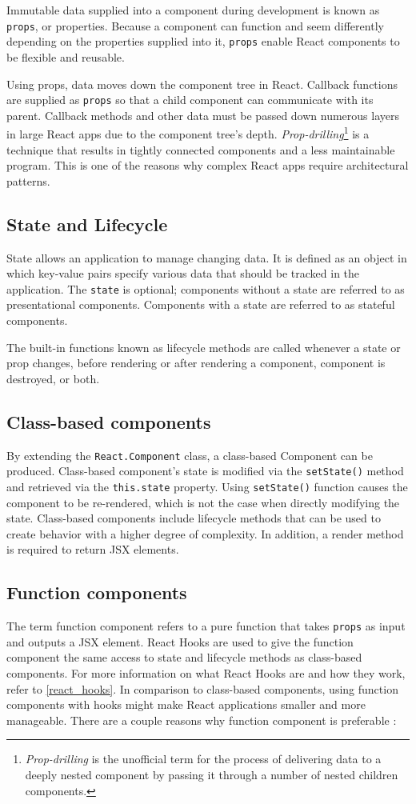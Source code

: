 Immutable data supplied into a component during development is known as \texttt{props}, or properties. Because a component can function and seem differently depending on the properties supplied into it, \texttt{props} enable React components to be flexible and reusable.

Using props, data moves down the component tree in React. Callback functions are supplied as \texttt{props} so that a child component can communicate with its parent. Callback methods and other data must be passed down numerous layers in large React apps due to the component tree's depth. \emph{Prop-drilling}\footnote{\emph{Prop-drilling} is the unofficial term for the process of delivering data to a deeply nested component by passing it through a number of nested children components.} is a technique that results in tightly connected components and a less maintainable program. This is one of the reasons why complex React apps require architectural patterns.

\subsection{State and Lifecycle}
State allows an application to manage changing data. It is defined as an object in which key-value pairs specify various data that should be tracked in the application. The \texttt{state} is optional; components without a state are referred to as presentational components. Components with a state are referred to as stateful components.

The built-in functions known as lifecycle methods are called whenever a state or prop changes, before rendering or after rendering a component, component is destroyed, or both.

\subsection{Class-based components}
By extending the \texttt{React.Component} class, a class-based Component can be produced. Class-based component's state is modified via the \texttt{setState()} method and retrieved via the \texttt{this.state} property. Using \texttt{setState()} function causes the component to be re-rendered, which is not the case when directly modifying the state. Class-based components include lifecycle methods that can be used to create behavior with a higher degree of complexity. In addition, a render method is required to return JSX elements.


\subsection{Function components}
The term function component refers to a pure function that takes \texttt{props} as input and outputs a JSX element. React Hooks are used to give the function component the same access to state and lifecycle methods as class-based components. For more information on what React Hooks are and how they work, refer to \autoref{react_hooks}. In comparison to class-based components, using function components with hooks might make React applications smaller and more manageable. There are a couple reasons why function component is preferable \autocite{phan2020react}:

